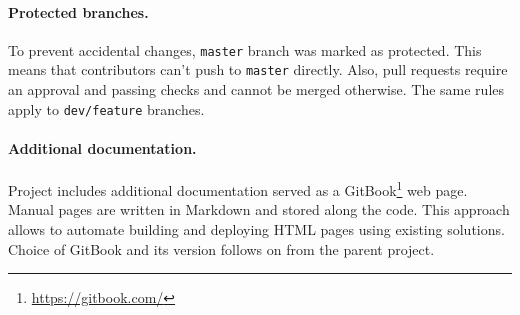 \paragraph{Protected branches.}
To prevent accidental changes, \texttt{master} branch was marked as protected.
This means that contributors can't push to \texttt{master} directly.
Also, pull requests require an approval and passing checks and cannot be merged otherwise.
The same rules apply to \texttt{dev/feature} branches.

\paragraph{Additional documentation.}
Project includes additional documentation served as a GitBook\footnote{\href{https://gitbook.com/}{https://gitbook.com/}} web page.
Manual pages are written in Markdown and stored along the code.
This approach allows to automate building and deploying HTML pages using existing solutions.
Choice of GitBook and its version follows on from the parent project.
